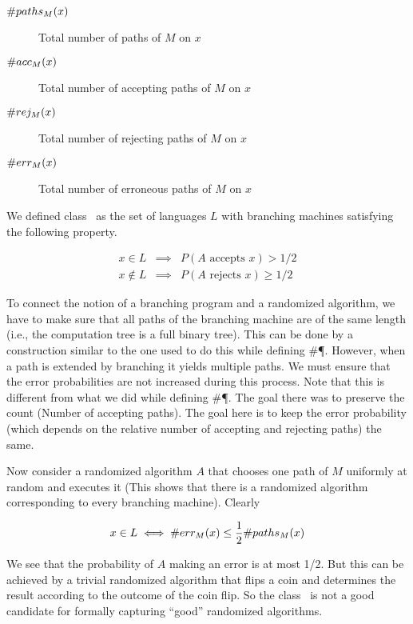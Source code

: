 \begin{description}
\item[$\#paths_{M}(x)$] Total number of paths of $M$ on $x$

\item[$\#acc_{M}(x)$] Total number of accepting paths of $M$ on $x$

\item[$\#rej_{M}(x)$] Total number of rejecting paths of $M$ on $x$

\item[$\#err_{M}(x)$] Total number of erroneous paths of $M$ on $x$
\end{description}

We defined class \PP\ as the set of languages $L$ with branching machines 
satisfying the following property.

\begin{eqnarray*}
x \in L &\implies& P(A \textrm{ accepts } x) > 1/2 \\
x \notin L &\implies& P(A \textrm{ rejects } x) \geq 1/2
\end{eqnarray*}

To connect the notion of a branching program and a randomized algorithm, we have to make sure 
that all paths of the branching machine are of the same length (i.e., the computation tree is a full 
binary tree). This can be done by a construction similar to the one used to do this while defining \#\P.
However, when a path is extended by branching it yields multiple paths. We must ensure that the error probabilities are not 
increased during this process.
Note that this is different from what we did while defining \#\P. 
The goal there was to preserve the count (Number of accepting paths). 
The goal here is to keep the error probability (which depends on the relative number of accepting and rejecting paths) the same.

Now consider a randomized algorithm $A$ that chooses one path of $M$ uniformly at random and 
executes it (This shows that there is a randomized algorithm corresponding to every branching machine). 
Clearly

\begin{equation}
x \in L \iff \#err_{M}(x) \leq \frac{1}{2} \#paths_{M}(x)
\end{equation}


We see that the probability of $A$ making an error is at most 1/2. But this can be 
achieved by a trivial randomized algorithm that flips a coin and determines the result according 
to the outcome of the coin flip. So the class \PP\ is not a good candidate for formally capturing 
``good'' randomized algorithms.

